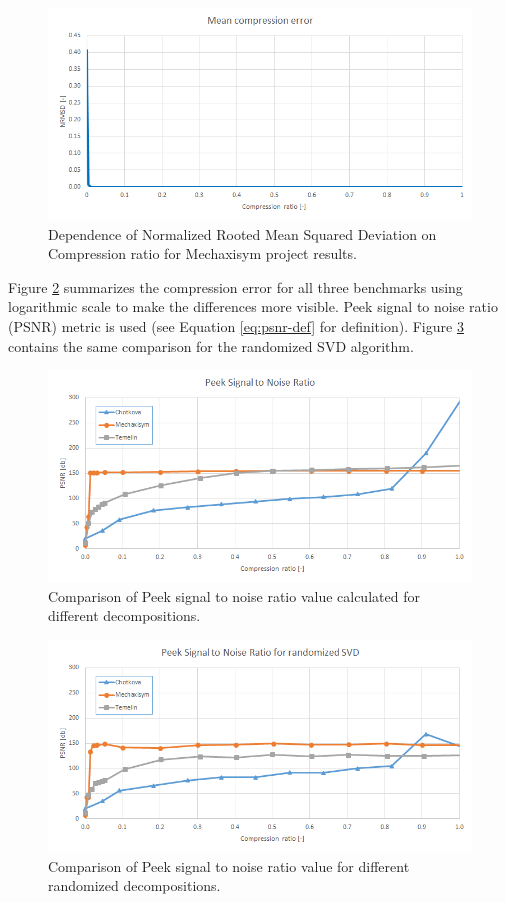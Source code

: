\begin{figure}[H]
\centering\includegraphics[width=\textwidth]{figures/mechaxisym_NRMSD}
\caption{Dependence of Normalized Rooted Mean Squared Deviation on Compression ratio for Mechaxisym project results.}
\label{fig:mechaxisym:NRMSD}
\end{figure}

Figure \ref{fig:PSNR} summarizes the compression error for all three benchmarks using logarithmic scale to make the differences more visible. Peek signal to noise ratio (PSNR) metric is used (see Equation \ref{eq:psnr-def} for definition). Figure \ref{fig:PSNR_rand} contains the same comparison for the randomized SVD algorithm.

\begin{figure}[H]
\centering\includegraphics[width=\textwidth]{figures/PSNR}
\caption{Comparison of Peek signal to noise ratio value calculated for different decompositions.}
\label{fig:PSNR}
\end{figure}

\begin{figure}[H]
\centering\includegraphics[width=\textwidth]{figures/PSNR_rand}
\caption{Comparison of Peek signal to noise ratio value for different randomized decompositions.}
\label{fig:PSNR_rand}
\end{figure}

